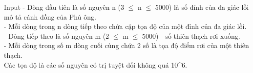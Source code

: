 Input
- Dòng đầu tiên là số nguyên n (3  $\le$  n  $\le$  5000) là số đỉnh của đa giác lồi mô tả cánh đồng của Phú ông.   
\\   - Mỗi dòng trong n dòng tiếp theo chứa cặp tọa độ của một đỉnh của đa giác lồi.   
\\   - Dòng tiếp theo là số nguyên m (2  $\le$  m  $\le$  5000) - số thiên thạch rơi xuống.   
\\   - Mỗi dòng trong số m dòng cuối cùng chứa 2 số là tọa độ điểm rơi của một thiên thạch.   
\\   Các tọa độ là các số nguyên có trị tuyệt đối không quá 10^6.